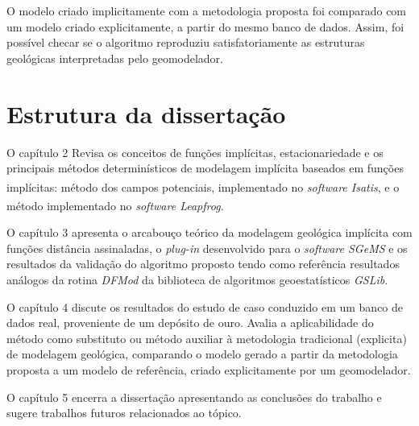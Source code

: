 O modelo criado implicitamente com a metodologia proposta foi comparado com um modelo criado explicitamente, a partir do mesmo banco de dados. Assim, foi possível checar se o algoritmo reproduziu satisfatoriamente as estruturas geológicas interpretadas pelo geomodelador.

\section{Estrutura da dissertação}

O capítulo 2 Revisa os conceitos de funções implícitas, estacionariedade e os principais métodos determinísticos de modelagem implícita baseados em funções implícitas: método dos campos potenciais, implementado no \textit{software Isatis}\textsuperscript{\textregistered}, e o método implementado no  \textit{software Leapfrog}\textsuperscript{\textregistered}.

O capítulo 3 apresenta o arcabouço teórico da modelagem geológica implícita com funções distância assinaladas, o \textit{plug-in} desenvolvido para o  \textit{software SGeMS} e os resultados da validação do algoritmo proposto tendo como referência resultados análogos da rotina \textit{DFMod} da biblioteca de algoritmos geoestatísticos \textit{GSLib}.

O capítulo 4 discute os resultados do estudo de caso conduzido em um banco de dados real, proveniente de um depósito de ouro. Avalia a aplicabilidade do método como substituto ou método auxiliar à metodologia tradicional (explicita) de modelagem geológica, comparando o modelo gerado a partir da metodologia proposta a um modelo de referência, criado explicitamente por um geomodelador. 

O capítulo 5 encerra a dissertação apresentando as conclusões do trabalho  e sugere trabalhos futuros relacionados ao tópico. 

